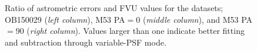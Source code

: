 \documentclass[]{spie}  %
\begin{document}
\begin{figure}[!h]
  \hspace{-1.5cm}
  \caption{\footnotesize Ratio of astrometric errors and FVU values for the datasets; OB150029 (\textit{left column}), M53 PA$=$0 (\textit{middle column}), and M53 PA$=$90 (\textit{right column}). Values larger than one indicate better fitting and subtraction through variable-PSF mode.} \label{fig:ob-m53-astromfvu-ratios}
\end{figure}
\end{document}
